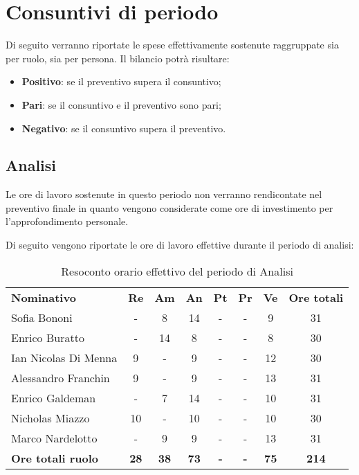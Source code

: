\documentclass[../piano-di-progetto.tex]{subfiles}
\begin{document}
\section{Consuntivi di periodo}
Di seguito verranno riportate le spese effettivamente sostenute raggruppate sia per ruolo, sia per persona. Il bilancio potrà risultare:

\begin{itemize}
    \item \textbf{Positivo}: se il preventivo supera il consuntivo;
    \item \textbf{Pari}: se il consuntivo e il preventivo sono pari;
    \item \textbf{Negativo}: se il consuntivo supera il preventivo.
\end{itemize}

\subsection{Analisi}
Le ore di lavoro sostenute in questo periodo non verranno rendicontate nel preventivo finale in quanto vengono considerate come ore di investimento per l'approfondimento personale.

Di seguito vengono riportate le ore di lavoro effettive durante il periodo di analisi:
\begin{table}[H]
    \centering
    \begin{tabular}{lccccccc}
      \rowcolor{lightgray}
      \textbf{Nominativo}        & \textbf{Re} & \textbf{Am}  & \textbf{An} & \textbf{Pt}  & \textbf{Pr}   & \textbf{Ve} & \textbf{Ore totali} \\
      Sofia Bononi              & -          & 8          & 14          & -          & -          & 9          & 31          \\
      Enrico Buratto            & -          & 14         & 8          & -          & -          & 8          & 30          \\
      Ian Nicolas Di Menna      & 9          & -          & 9          & -          & -          & 12          & 30          \\
      Alessandro Franchin       & 9          & -          & 9          & -          & -          & 13          & 31         \\
      Enrico Galdeman           & -          & 7          & 14          & -          & -          & 10          & 31          \\
      Nicholas Miazzo           & 10         & -          & 10          & -          & -          & 10         & 30         \\
      Marco Nardelotto          & -          & 9          & 9         & -          & -          & 13          & 31          \\
      \textbf{Ore totali ruolo} & \textbf{28} & \textbf{38} & \textbf{73} & \textbf{-} & \textbf{-} & \textbf{75} & \textbf{214}
    \end{tabular}
    \caption{Resoconto orario effettivo del periodo di Analisi}
  \end{table}
\end{document}
